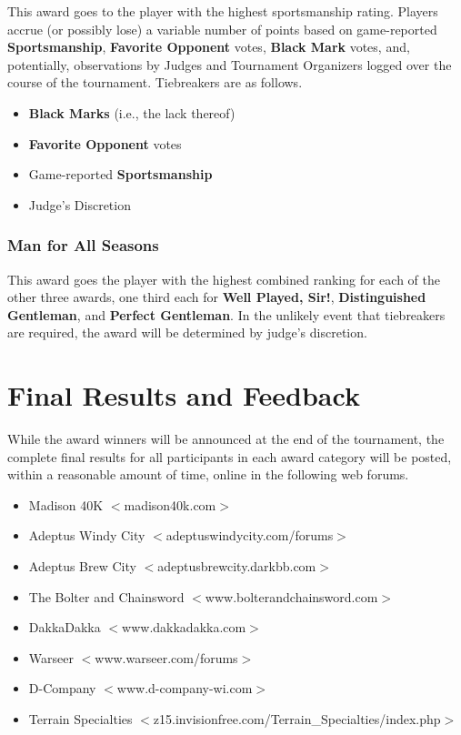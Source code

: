 \documentclass[10pt,titlepage]{article}
\begin{document}
This award goes to the player with the highest sportsmanship rating. Players accrue (or possibly lose) a variable number of points based on game-reported \textbf{Sportsmanship}, \textbf{Favorite Opponent} votes, \textbf{Black Mark} votes, and, potentially, observations by Judges and Tournament Organizers logged over the course of the tournament. Tiebreakers are as follows.

\begin{itemize}
\setlength{\itemsep}{0pt}
\item \textbf{Black Marks} (i.e., the lack thereof)
\item \textbf{Favorite Opponent} votes
\item Game-reported \textbf{Sportsmanship}
\item Judge's Discretion
\end{itemize}

\subsubsection*{Man for All Seasons}

This award goes the player with the highest combined ranking for each of the other three awards, one third each for \textbf{Well Played, Sir!}, \textbf{Distinguished Gentleman}, and \textbf{Perfect Gentleman}. In the unlikely event that tiebreakers are required, the award will be determined by judge's discretion.

\section*{Final Results and Feedback}

While the award winners will be announced at the end of the tournament, the complete final results for all participants in each award category will be posted, within a reasonable amount of time, online in the following web forums.

\begin{itemize}
\setlength{\itemsep}{0pt}
\item Madison 40K $<$madison40k.com$>$
\item Adeptus Windy City $<$adeptuswindycity.com/forums$>$
\item Adeptus Brew City $<$adeptusbrewcity.darkbb.com$>$
\item The Bolter and Chainsword $<$www.bolterandchainsword.com$>$
\item DakkaDakka $<$www.dakkadakka.com$>$
\item Warseer $<$www.warseer.com/forums$>$
\item D-Company $<$www.d-company-wi.com$>$
\item Terrain Specialties $<$z15.invisionfree.com/Terrain\_Specialties/index.php$>$
\end{itemize}
\end{document}
